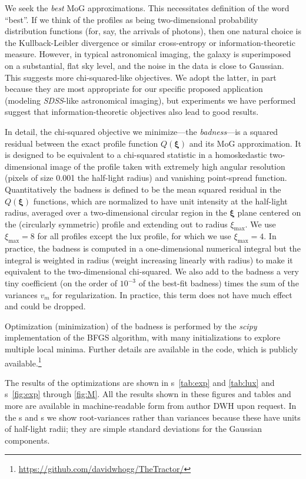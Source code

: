 \documentclass[12pt,pdftex,preprint]{aastex}
\newcommand{\project}[1]{\textsl{#1}}
\newcommand{\sdss}{\project{SDSS}}
\newcommand{\tvector}[1]{\boldsymbol{#1}}
\newcommand{\spos}{\tvector{\xi}}
\newcommand{\lux}{\mathrm{lux}}
\begin{document}
We seek the \emph{best} MoG approximations.  This necessitates
definition of the word ``best''.  If we think of the profiles as being
two-dimensional probability distribution functions (for, say, the
arrivals of photons), then one natural choice is the Kullback-Leibler
divergence or similar cross-entropy or information-theoretic measure.
However, in typical astronomical imaging, the galaxy is superimposed
on a substantial, flat sky level, and the noise in the data is close
to Gaussian.  This suggests more chi-squared-like objectives.  We
adopt the latter, in part because they are most appropriate for our
specific proposed application (modeling \sdss-like astronomical
imaging), but experiments we have performed suggest that
information-theoretic objectives also lead to good results.

In detail, the chi-squared objective we minimize---the
\emph{badness}---is a squared residual between the exact profile
function $Q(\spos)$ and its MoG approximation.  It is designed to be
equivalent to a chi-squared statistic in a homoskedastic
two-dimensional image of the profile taken with extremely high angular
resolution (pixels of size 0.001 the half-light radius) and vanishing
point-spread function.  Quantitatively the badness is defined to be
the mean squared residual in the $Q(\spos)$ functions, which are
normalized to have unit intensity at the half-light radius, averaged
over a two-dimensional circular region in the $\spos$ plane centered
on the (circularly symmetric) profile and extending out to radius
$\xi_{\max}$.  We use $\xi_{\max}=8$ for all profiles except the
$\lux$ profile, for which we use $\xi_{\max}=4$.  In practice, the
badness is computed in a one-dimensional numerical integral but the
integral is weighted in radius (weight increasing linearly with
radius) to make it equivalent to the two-dimensional chi-squared.  We
also add to the badness a very tiny coefficient (on the order of
$10^{-3}$ of the best-fit badness) times the sum of the variances
$v_m$ for regularization.  In practice, this term does not have much
effect and could be dropped.

Optimization (minimization) of the badness is performed by the
\project{scipy} implementation of the BFGS algorithm, with many
initializations to explore multiple local minima.  Further details are
available in the code, which is publicly
available.\footnote{\url{https://github.com/davidwhogg/TheTractor/}}

The results of the optimizations are shown in \tablename
s~\ref{tab:exp} and \ref{tab:lux} and \figurename s~\ref{fig:exp}
through \ref{fig:M}.  All the results shown in these figures and
tables and more are available in machine-readable form from author DWH
upon request.  In the \tablename s and \figurename s we show
root-variances rather than variances because these have units of
half-light radii; they are simple standard deviations for the Gaussian
components.
\end{document}

